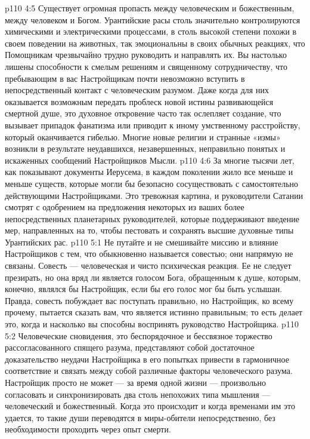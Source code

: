 \vs p110 4:5 \pc Существует огромная пропасть между человеческим и божественным, между человеком и Богом. Урантийские расы столь значительно контролируются химическими и электрическими процессами, в столь высокой степени похожи в своем поведении на животных, так эмоциональны в своих обычных реакциях, что Помощникам чрезвычайно трудно руководить и направлять их. Вы настолько лишены способности к смелым решениям и священному сотрудничеству, что пребывающим в вас Настройщикам почти невозможно вступить в непосредственный контакт с человеческим разумом. Даже когда для них оказывается возможным передать проблеск новой истины развивающейся смертной душе, это духовное откровение часто так ослепляет создание, что вызывает припадок фанатизма или приводит к иному умственному расстройству, который оканчивается гибелью. Многие новые религии и странные «измы» возникли в результате неудавшихся, незавершенных, неправильно понятых и искаженных сообщений Настройщиков Мысли.
\vs p110 4:6 За многие тысячи лет, как показывают документы Иерусема, в каждом поколении жило все меньше и меньше существ, которые могли бы безопасно сосуществовать с самостоятельно действующими Настройщиками. Это тревожная картина, и руководители Сатании смотрят с одобрением на предложения некоторых из ваших более непосредственных планетарных руководителей, которые поддерживают введение мер, направленных на то, чтобы пестовать и сохранять высшие духовные типы Урантийских рас.
\vs p110 5:1 Не путайте и не смешивайте миссию и влияние Настройщиков с тем, что обыкновенно называется совестью; они напрямую не связаны. Совесть --- человеческая и чисто психическая реакция. Ее не следует презирать, но она вряд ли является голосом Бога, обращенным к душе, которым, конечно, являлся бы Настройщик, если бы его голос мог бы быть услышан. Правда, совесть побуждает вас поступать правильно, но Настройщик, ко всему прочему, пытается сказать вам, что является истинно правильным; то есть делает это, когда и насколько вы способны воспринять руководство Настройщика.
\vs p110 5:2 \pc Человеческие сновидения, это беспорядочное и бессвязное торжество рассогласованного спящего разума, представляют собой достаточное доказательство неудачи Настройщика в его попытках привести в гармоничное соответствие и связать между собой различные факторы человеческого разума. Настройщик просто не может --- за время одной жизни --- произвольно согласовать и синхронизировать два столь непохожих типа мышления --- человеческий и божественный. Когда это происходит и когда временами им это удается, то такие души переводятся в миры\hyp{}обители непосредственно, без необходимости проходить через опыт смерти.
